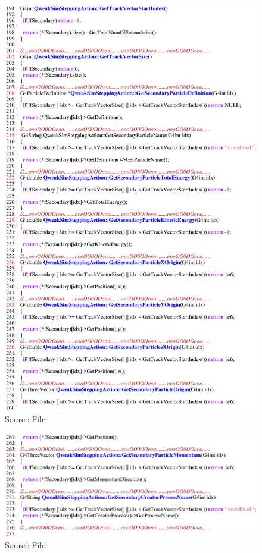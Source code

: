 \begin{figure}[h]
  \hspace{0cm}
  \includegraphics[scale=0.8]{./figures16/QweakSimSteppingAction.cc-p4.eps}
  \caption{Source File}
           \label{fig:XVI-SC-5}
\end{figure}
\clearpage

\begin{figure}[h]
  \hspace{0cm}
  \includegraphics[scale=0.8]{./figures16/QweakSimSteppingAction.cc-p5.eps}
  \caption{Source File}
           \label{fig:XVI-SC-6}
\end{figure}
\clearpage

